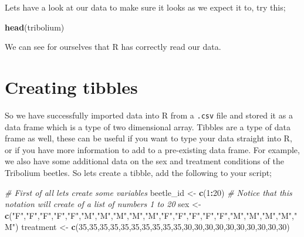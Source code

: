 \documentclass[
]{book}
\newenvironment{Shaded}{\begin{snugshade}}{\end{snugshade}}
\newcommand{\CommentTok}[1]{\textcolor[rgb]{0.56,0.35,0.01}{\textit{#1}}}
\newcommand{\DecValTok}[1]{\textcolor[rgb]{0.00,0.00,0.81}{#1}}
\newcommand{\FunctionTok}[1]{\textcolor[rgb]{0.13,0.29,0.53}{\textbf{#1}}}
\newcommand{\NormalTok}[1]{#1}
\newcommand{\OtherTok}[1]{\textcolor[rgb]{0.56,0.35,0.01}{#1}}
\newcommand{\SpecialCharTok}[1]{\textcolor[rgb]{0.81,0.36,0.00}{\textbf{#1}}}
\newcommand{\StringTok}[1]{\textcolor[rgb]{0.31,0.60,0.02}{#1}}
\begin{document}
Lets have a look at our data to make sure it looks as we expect it to, try this;

\begin{Shaded}
\begin{Highlighting}[]
\FunctionTok{head}\NormalTok{(tribolium)}
\end{Highlighting}
\end{Shaded}

We can see for ourselves that R has correctly read our data.

\hypertarget{creating-tibbles}{%
\section{Creating tibbles}\label{creating-tibbles}}

So we have successfully imported data into R from a \texttt{.csv} file and stored it as a data frame which is a type of two dimensional array. Tibbles are a type of data frame as well, these can be useful if you want to type your data straight into R, or if you have more information to add to a pre-existing data frame. For example, we also have some additional data on the sex and treatment conditions of the Tribolium beetles. So lets create a tibble, add the following to your script;

\begin{Shaded}
\begin{Highlighting}[]
\CommentTok{\# First of all lets create some variables}
\NormalTok{beetle\_id }\OtherTok{\textless{}{-}} \FunctionTok{c}\NormalTok{(}\DecValTok{1}\SpecialCharTok{:}\DecValTok{20}\NormalTok{) }\CommentTok{\# Notice that this notation will create of a list of numbers 1 to 20}
\NormalTok{sex }\OtherTok{\textless{}{-}} \FunctionTok{c}\NormalTok{(}\StringTok{"F"}\NormalTok{,}\StringTok{"F"}\NormalTok{,}\StringTok{"F"}\NormalTok{,}\StringTok{"F"}\NormalTok{,}\StringTok{"F"}\NormalTok{,}\StringTok{"M"}\NormalTok{,}\StringTok{"M"}\NormalTok{,}\StringTok{"M"}\NormalTok{,}\StringTok{"M"}\NormalTok{,}\StringTok{"M"}\NormalTok{,}\StringTok{"F"}\NormalTok{,}\StringTok{"F"}\NormalTok{,}\StringTok{"F"}\NormalTok{,}\StringTok{"F"}\NormalTok{,}\StringTok{"F"}\NormalTok{,}\StringTok{"M"}\NormalTok{,}\StringTok{"M"}\NormalTok{,}\StringTok{"M"}\NormalTok{,}\StringTok{"M"}\NormalTok{,}\StringTok{"M"}\NormalTok{)}
\NormalTok{treatment }\OtherTok{\textless{}{-}} \FunctionTok{c}\NormalTok{(}\DecValTok{35}\NormalTok{,}\DecValTok{35}\NormalTok{,}\DecValTok{35}\NormalTok{,}\DecValTok{35}\NormalTok{,}\DecValTok{35}\NormalTok{,}\DecValTok{35}\NormalTok{,}\DecValTok{35}\NormalTok{,}\DecValTok{35}\NormalTok{,}\DecValTok{35}\NormalTok{,}\DecValTok{35}\NormalTok{,}\DecValTok{30}\NormalTok{,}\DecValTok{30}\NormalTok{,}\DecValTok{30}\NormalTok{,}\DecValTok{30}\NormalTok{,}\DecValTok{30}\NormalTok{,}\DecValTok{30}\NormalTok{,}\DecValTok{30}\NormalTok{,}\DecValTok{30}\NormalTok{,}\DecValTok{30}\NormalTok{,}\DecValTok{30}\NormalTok{)}
\end{Highlighting}
\end{Shaded}
\end{document}
